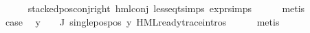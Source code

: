 \begin{isabellebody}
\ \ \ \ \isamarkupfalse%
\ stacked{\isacharunderscore}{\kern0pt}pos{\isacharunderscore}{\kern0pt}conj{\isacharunderscore}{\kern0pt}right\ hml{\isacharunderscore}{\kern0pt}conj\ less{\isacharunderscore}{\kern0pt}eq{\isacharunderscore}{\kern0pt}t{\isachardot}{\kern0pt}simps\ expr{\isachardot}{\kern0pt}simps\isanewline
\ \ \ \ \isamarkupfalse%
\ metis\isanewline
\ \ \isamarkupfalse%
\ {\isacharquery}{\kern0pt}case\ \isamarkupfalse%
\ {\isacartoucheopen}{\isacharparenleft}{\kern0pt}{\isasymforall}y\ {\isasymin}\ {\isacharparenleft}{\kern0pt}{\isasymPhi}\ {\isacharbackquote}{\kern0pt}\ J{\isacharparenright}{\kern0pt}{\isachardot}{\kern0pt}\ single{\isacharunderscore}{\kern0pt}pos{\isacharunderscore}{\kern0pt}pos\ y{\isacharparenright}{\kern0pt}{\isacartoucheclose}\ HML{\isacharunderscore}{\kern0pt}ready{\isacharunderscore}{\kern0pt}trace{\isachardot}{\kern0pt}intros{\isacharparenleft}{\kern0pt}{}{\isacharparenright}{\kern0pt}\isanewline
\ \ \ \ \isamarkupfalse%
\ metis\isanewline
{}\isamarkupfalse%
%
\endisatagproof
{\isafoldproof}%
%
\isadelimproof
\isanewline
%
\endisadelimproof
%
\isadelimtheory
%
\endisadelimtheory
%
\isatagtheory
{}\isamarkupfalse%
%
\endisatagtheory
{\isafoldtheory}%
%
\isadelimtheory
%
\endisadelimtheory
%
\end{isabellebody}%
\endinput
